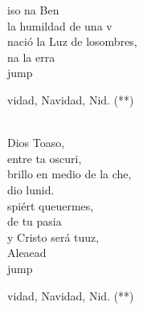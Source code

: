 \begin{cancion}
	iso na Ben  \\
	la humildad de una v\\
	nació la Luz de losombres, \\
	na    la erra \\jump\\
	\begin{chorus}%
	vidad, Navidad, Nid. (**)\\
	\end{chorus}%
	\jump\\
	 Dios Toaso, \\
	entre ta oscuri,\\
	brillo en medio de la che,\\
	dio  lunid.\\
	spiért queuermes, \\
	 de tu pasia\\
	y Cristo será tuuz, \\
	Aleaead\\jump\\
	\begin{chorus}%
	vidad, Navidad, Nid. (**)\\
	\end{chorus}%
	\jump\\
\end{cancion}%
